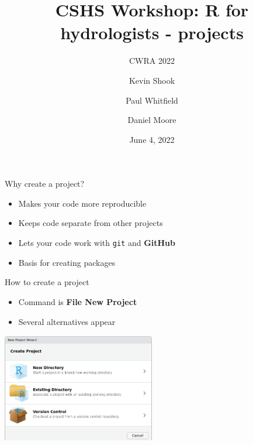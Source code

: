 \documentclass[
  ignorenonframetext,
  aspectratio=169]{beamer}
\title{CSHS Workshop: R for hydrologists - projects}
\subtitle{CWRA 2022}
\author{Kevin Shook \and Paul Whitfield \and Daniel Moore}
\date{June 4, 2022}
\institute{Canadian Society for Hydrological Sciences (CSHS)}
\providecommand{\tightlist}{%
  \setlength{\itemsep}{0pt}\setlength{\parskip}{0pt}}
\begin{document}
\frame{\titlepage}

\begin{frame}[fragile]{Why create a project?}
\protect\hypertarget{why-create-a-project}{}
\begin{itemize}
\tightlist
\item
  Makes your code more reproducible
\item
  Keeps code separate from other projects
\item
  Lets your code work with \texttt{git} and \textbf{GitHub}
\item
  Basis for creating packages
\end{itemize}
\end{frame}

\begin{frame}{How to create a project}
\protect\hypertarget{how-to-create-a-project}{}
\begin{itemize}
\tightlist
\item
  Command is \textbf{File \textbar{} New Project}
\item
  Several alternatives appear
\end{itemize}

\includegraphics[width=0.5\textwidth,height=\textheight]{figures/new_project.png}
\end{frame}
\end{document}
